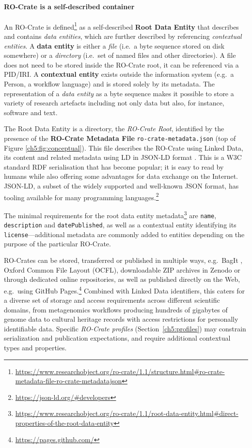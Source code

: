 \paragraph{RO-Crate is a self-described container}\label{ch5:selfdescribed}

An RO-Crate is defined\footnote{\url{https://www.researchobject.org/ro-crate/1.1/structure.html\#ro-crate-metadata-file-ro-crate-metadatajson}} as a self-described \textbf{Root Data Entity} that describes
and contains \emph{data entities}, which are further described by
referencing \emph{contextual entities}. A \textbf{data entity} is either
a \emph{file} (i.e.~a byte sequence stored on disk somewhere) or a
\emph{directory} (i.e.~set of named files and other directories). A file
does not need to be stored inside the RO-Crate root, it can be
referenced via a \acrshort{PID}/\acrshort{IRI}. A \textbf{contextual entity} exists outside
the information system (e.g.~a Person, a workflow language) and is
stored solely by its metadata. The representation of a \emph{data
entity} as a byte sequence makes it possible to store a variety of
research artefacts including not only data but also, for instance,
software and text.


The Root Data Entity is a directory, the \emph{RO-Crate Root},
identified by the presence of the \textbf{RO-Crate Metadata File}
\texttt{ro-crate-metadata.json} (top of Figure \vref{ch5:fig:conceptual}). This file describes the
RO-Crate using Linked Data, its content and related metadata using
\acrlong{LD} in \acrshort{JSON-LD} format \cite{Sporny 2014}. This
is a W3C standard \acrshort{RDF} serialisation that has become popular; it is easy
to read by humans while also offering some advantages for data exchange
on the Internet. JSON-LD, a subset of the widely supported and
well-known JSON format, has tooling available for many programming languages.\footnote{\url{https://json-ld.org/\#developers}}

The minimal requirements for the root data entity
metadata\footnote{\url{https://www.researchobject.org/ro-crate/1.1/root-data-entity.html\#direct-properties-of-the-root-data-entity}}
are \texttt{name}, \texttt{description} and \texttt{datePublished}, as well as a contextual
entity identifying its \texttt{license}---additional metadata are commonly
added to entities depending on the purpose of the particular RO-Crate.

RO-Crates can be stored, transferred or published in multiple ways,
e.g.~BagIt \cite{Kunze 2018}, Oxford
Common File Layout \cite{OCFL 2020} (OCFL),
downloadable ZIP archives in Zenodo or through dedicated online
repositories, as well as published directly on the Web, e.g.~using
GitHub Pages.\footnote{\url{https://pages.github.com/}} Combined with Linked Data identifiers, this caters for a diverse set of storage and access
requirements across different scientific domains, from metagenomics
workflows producing hundreds of gigabytes of genome data to cultural
heritage records with access restrictions for personally identifiable
data. Specific \emph{RO-Crate profiles} (Section~\vref{ch5:profiles}) may constrain serialization
and publication expectations, and require additional contextual types
and properties.

